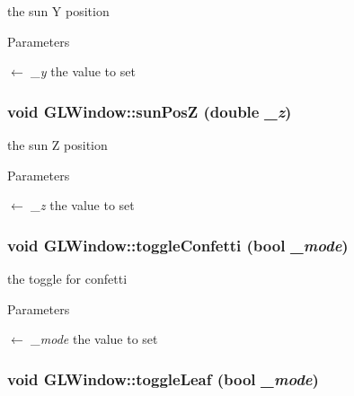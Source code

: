 the sun Y position 
\begin{DoxyParams}{Parameters}
\item[\mbox{$\leftarrow$} {\em \_\-y}]the value to set \end{DoxyParams}
\hypertarget{classGLWindow_a56ed4affeadf595cc03e4728fc1a1611}{
\subsubsection[{sunPosZ}]{\setlength{\rightskip}{0pt plus 5cm}void GLWindow::sunPosZ (double {\em \_\-z})}}
\label{classGLWindow_a56ed4affeadf595cc03e4728fc1a1611}


the sun Z position 
\begin{DoxyParams}{Parameters}
\item[\mbox{$\leftarrow$} {\em \_\-z}]the value to set \end{DoxyParams}
\hypertarget{classGLWindow_a924417cfa710d3d125fa7a046d90ddb8}{
\subsubsection[{toggleConfetti}]{\setlength{\rightskip}{0pt plus 5cm}void GLWindow::toggleConfetti (bool {\em \_\-mode})}}
\label{classGLWindow_a924417cfa710d3d125fa7a046d90ddb8}


the toggle for confetti 
\begin{DoxyParams}{Parameters}
\item[\mbox{$\leftarrow$} {\em \_\-mode}]the value to set \end{DoxyParams}
\hypertarget{classGLWindow_a405855727f72c698f1265765271fcfad}{
\subsubsection[{toggleLeaf}]{\setlength{\rightskip}{0pt plus 5cm}void GLWindow::toggleLeaf (bool {\em \_\-mode})}}
\label{classGLWindow_a405855727f72c698f1265765271fcfad}



